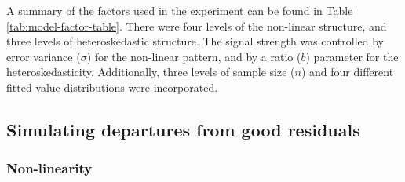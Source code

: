 \documentclass[]{interact}
\theoremstyle{plain}%
\theoremstyle{definition}
\theoremstyle{remark}
\begin{document}
A summary of the factors used in the experiment can be found in Table
\ref{tab:model-factor-table}. There were four levels of the non-linear
structure, and three levels of heteroskedastic structure. The signal
strength was controlled by error variance (\(\sigma\)) for the
non-linear pattern, and by a ratio (\(b\)) parameter for the
heteroskedasticity. Additionally, three levels of sample size (\(n\))
and four different fitted value distributions were incorporated.

\hypertarget{simulating-departures-from-good-residuals}{%
\subsection{Simulating departures from good
residuals}\label{simulating-departures-from-good-residuals}}

\hypertarget{non-linearity}{%
\subsubsection{Non-linearity}\label{non-linearity}}

\begin{table}

\caption{\label{tab:model-factor-table}Levels of the factors used in data collection periods I, II, III.}
\centering
{}
\end{table}
\end{document}
